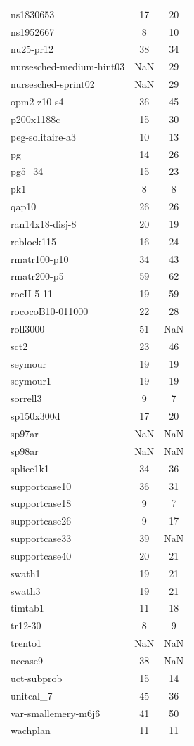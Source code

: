\begin{longtable}{lcc}
ns1830653 & 17 & 20 \\
ns1952667 & 8 & 10 \\
nu25-pr12 & 38 & 34 \\
nursesched-medium-hint03 & NaN & 29 \\
nursesched-sprint02 & NaN & 29 \\
opm2-z10-s4 & 36 & 45 \\
p200x1188c & 15 & 30 \\
peg-solitaire-a3 & 10 & 13 \\
pg & 14 & 26 \\
pg5_34 & 15 & 23 \\
pk1 & 8 & 8 \\
qap10 & 26 & 26 \\
ran14x18-disj-8 & 20 & 19 \\
reblock115 & 16 & 24 \\
rmatr100-p10 & 34 & 43 \\
rmatr200-p5 & 59 & 62 \\
rocII-5-11 & 19 & 59 \\
rococoB10-011000 & 22 & 28 \\
roll3000 & 51 & NaN \\
sct2 & 23 & 46 \\
seymour & 19 & 19 \\
seymour1 & 19 & 19 \\
sorrell3 & 9 & 7 \\
sp150x300d & 17 & 20 \\
sp97ar & NaN & NaN \\
sp98ar & NaN & NaN \\
splice1k1 & 34 & 36 \\
supportcase10 & 36 & 31 \\
supportcase18 & 9 & 7 \\
supportcase26 & 9 & 17 \\
supportcase33 & 39 & NaN \\
supportcase40 & 20 & 21 \\
swath1 & 19 & 21 \\
swath3 & 19 & 21 \\
timtab1 & 11 & 18 \\
tr12-30 & 8 & 9 \\
trento1 & NaN & NaN \\
uccase9 & 38 & NaN \\
uct-subprob & 15 & 14 \\
unitcal_7 & 45 & 36 \\
var-smallemery-m6j6 & 41 & 50 \\
wachplan & 11 & 11 \\
\end{longtable}
